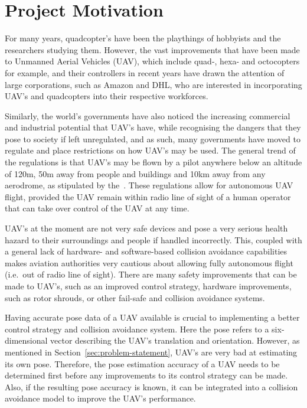 \section{Project Motivation}

For many years, quadcopter's have been the playthings of hobbyists and the researchers studying them. However, the vast improvements that have been made to Unmanned Aerial Vehicles (UAV), which include quad-, hexa- and octocopters for example, and their controllers in recent years have drawn the attention of large corporations, such as Amazon and DHL, who are interested in incorporating UAV's and quadcopters into their respective workforces. 

Similarly, the world's governments have also noticed the increasing commercial and industrial potential that UAV's have, while recognising the dangers that they pose to society if left unregulated, and as such, many governments have moved to regulate and place restrictions on how UAV's may be used. The general trend of the regulations is that UAV's may be flown by a pilot anywhere below an altitude of 120m, 50m away from people and buildings and 10km away from any aerodrome, as stipulated by the~\cite{sacaa-drone-regs}. These regulations allow for autonomous UAV flight, provided the UAV remain within radio line of sight of a human operator that can take over control of the UAV at any time. 

UAV's at the moment are not very safe devices and pose a very serious health hazard to their surroundings and people if handled incorrectly. This, coupled with a general lack of hardware- and software-based collision avoidance capabilities makes aviation authorities very cautious about allowing fully autonomous flight (i.e.\ out of radio line of sight). There are many safety improvements that can be made to UAV's, such as an improved control strategy, hardware improvements, such as rotor shrouds, or other fail-safe and collision avoidance systems. 

Having accurate pose data of a UAV available is crucial to implementing a better control strategy and collision avoidance system. Here the pose refers to a six-dimensional vector describing the UAV's translation and orientation. However, as mentioned in Section~\ref{sec:problem-statement}, UAV's are very bad at estimating its own pose. Therefore, the pose estimation accuracy of a UAV needs to be determined first before any improvements to its control strategy can be made. Also, if the resulting pose accuracy is known, it can be integrated into a collision avoidance model to improve the UAV's performance. 

